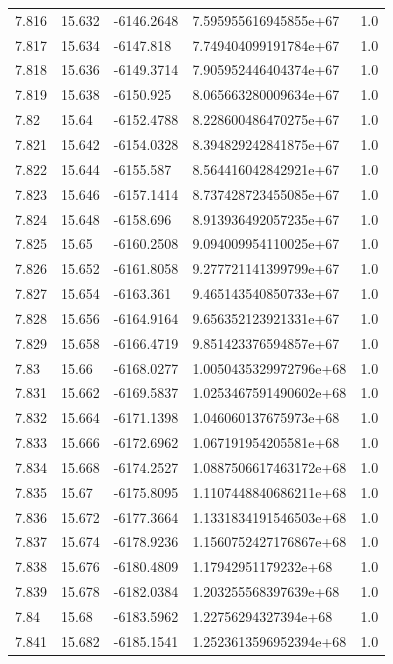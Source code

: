 \begin{tabular}{lllll}
7.816 & 15.632 & -6146.2648 & 7.595955616945855e+67 & 1.0 \\
7.817 & 15.634 & -6147.818 & 7.749404099191784e+67 & 1.0 \\
7.818 & 15.636 & -6149.3714 & 7.905952446404374e+67 & 1.0 \\
7.819 & 15.638 & -6150.925 & 8.065663280009634e+67 & 1.0 \\
7.82 & 15.64 & -6152.4788 & 8.228600486470275e+67 & 1.0 \\
7.821 & 15.642 & -6154.0328 & 8.394829242841875e+67 & 1.0 \\
7.822 & 15.644 & -6155.587 & 8.564416042842921e+67 & 1.0 \\
7.823 & 15.646 & -6157.1414 & 8.737428723455085e+67 & 1.0 \\
7.824 & 15.648 & -6158.696 & 8.913936492057235e+67 & 1.0 \\
7.825 & 15.65 & -6160.2508 & 9.094009954110025e+67 & 1.0 \\
7.826 & 15.652 & -6161.8058 & 9.277721141399799e+67 & 1.0 \\
7.827 & 15.654 & -6163.361 & 9.465143540850733e+67 & 1.0 \\
7.828 & 15.656 & -6164.9164 & 9.656352123921331e+67 & 1.0 \\
7.829 & 15.658 & -6166.4719 & 9.851423376594857e+67 & 1.0 \\
7.83 & 15.66 & -6168.0277 & 1.0050435329972796e+68 & 1.0 \\
7.831 & 15.662 & -6169.5837 & 1.0253467591490602e+68 & 1.0 \\
7.832 & 15.664 & -6171.1398 & 1.046060137675973e+68 & 1.0 \\
7.833 & 15.666 & -6172.6962 & 1.067191954205581e+68 & 1.0 \\
7.834 & 15.668 & -6174.2527 & 1.0887506617463172e+68 & 1.0 \\
7.835 & 15.67 & -6175.8095 & 1.1107448840686211e+68 & 1.0 \\
7.836 & 15.672 & -6177.3664 & 1.1331834191546503e+68 & 1.0 \\
7.837 & 15.674 & -6178.9236 & 1.1560752427176867e+68 & 1.0 \\
7.838 & 15.676 & -6180.4809 & 1.17942951179232e+68 & 1.0 \\
7.839 & 15.678 & -6182.0384 & 1.203255568397639e+68 & 1.0 \\
7.84 & 15.68 & -6183.5962 & 1.22756294327394e+68 & 1.0 \\
7.841 & 15.682 & -6185.1541 & 1.2523613596952394e+68 & 1.0 \\

\end{tabular}
